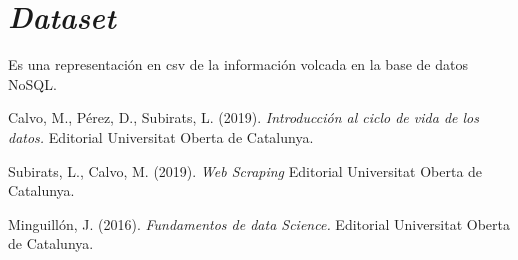 \documentclass[a4paper, 12pt]{article}
\begin{document}
\section{{\itshape Dataset}}

Es una representación en csv de la información volcada en la base de datos NoSQL.


\newpage
{}
\begin{thebibliography}{0}
	
	 Calvo, M., Pérez, D., Subirats, L. (2019). {\itshape Introducción al ciclo de vida de los datos. } Editorial Universitat Oberta de Catalunya.	
	
	 Subirats, L., Calvo, M. (2019). {\itshape Web Scraping } Editorial Universitat Oberta de Catalunya.
	
	 Minguillón, J. (2016). {\itshape Fundamentos de data Science. } Editorial Universitat Oberta de Catalunya.
	
\end{thebibliography}
\end{document}
